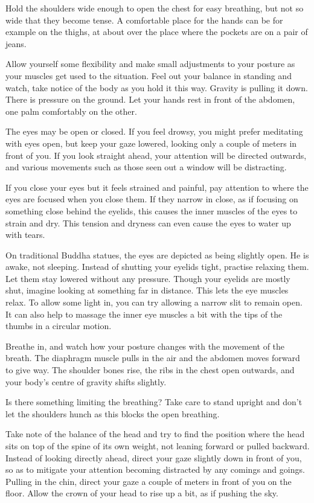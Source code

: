 Hold the shoulders wide enough to open the chest for easy breathing, but
not so wide that they become tense. A comfortable place for the hands
can be for example on the thighs, at about over the place where the
pockets are on a pair of jeans.

Allow yourself some flexibility and make small adjustments to your
posture as your muscles get used to the situation. Feel out your balance
in standing and watch, take notice of the body as you hold it this way.
Gravity is pulling it down. There is pressure on the ground. Let your
hands rest in front of the abdomen, one palm comfortably on the other.

The eyes may be open or closed. If you feel drowsy, you might prefer
meditating with eyes open, but keep your gaze lowered, looking only a
couple of meters in front of you. If you look straight ahead, your
attention will be directed outwards, and various movements such as those
seen out a window will be distracting.

If you close your eyes but it feels strained and painful, pay attention
to where the eyes are focused when you close them. If they narrow in
close, as if focusing on something close behind the eyelids, this causes
the inner muscles of the eyes to strain and dry. This tension and
dryness can even cause the eyes to water up with tears.

On traditional Buddha statues, the eyes are depicted as being slightly
open. He is awake, not sleeping. Instead of shutting your eyelids tight,
practise relaxing them. Let them stay lowered without any pressure.
Though your eyelids are mostly shut, imagine looking at something far in
distance. This lets the eye muscles relax. To allow some light in, you
can try allowing a narrow slit to remain open. It can also help to
massage the inner eye muscles a bit with the tips of the thumbs in a
circular motion.

Breathe in, and watch how your posture changes with the movement of the
breath. The diaphragm muscle pulls in the air and the abdomen moves
forward to give way. The shoulder bones rise, the ribs in the chest open
outwards, and your body's centre of gravity shifts slightly.

Is there something limiting the breathing? Take care to stand upright
and don't let the shoulders hunch as this blocks the open breathing.

Take note of the balance of the head and try to find the position where
the head sits on top of the spine of its own weight, not leaning forward
or pulled backward. Instead of looking directly ahead, direct your gaze
slightly down in front of you, so as to mitigate your attention becoming
distracted by any comings and goings. Pulling in the chin, direct your
gaze a couple of meters in front of you on the floor. Allow the crown of
your head to rise up a bit, as if pushing the sky.

